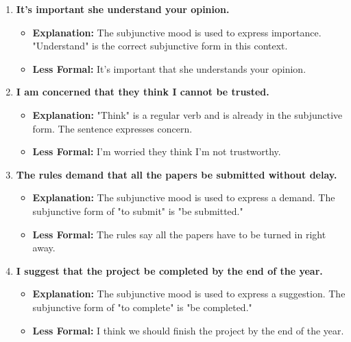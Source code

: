 \begin{enumerate}
\begin{itemize}
            \end{itemize}
      \item \textbf{It's important she understand your opinion.}
            \begin{itemize}
                  \item \textbf{Explanation:} The subjunctive mood is used to express importance. "Understand" is the correct subjunctive form in this context.
                  \item \textbf{Less Formal:} It's important that she understands your opinion.
            \end{itemize}
      \item \textbf{I am concerned that they think I cannot be trusted.}
            \begin{itemize}
                  \item \textbf{Explanation:} "Think" is a regular verb and is already in the subjunctive form. The sentence expresses concern.
                  \item \textbf{Less Formal:} I'm worried they think I'm not trustworthy.
            \end{itemize}
      \item \textbf{The rules demand that all the papers be submitted without delay.}
            \begin{itemize}
                  \item \textbf{Explanation:} The subjunctive mood is used to express a demand. The subjunctive form of "to submit" is "be submitted."
                  \item \textbf{Less Formal:} The rules say all the papers have to be turned in right away.
            \end{itemize}
      \item \textbf{I suggest that the project be completed by the end of the year.}
            \begin{itemize}
                  \item \textbf{Explanation:} The subjunctive mood is used to express a suggestion. The subjunctive form of "to complete" is "be completed."
                  \item \textbf{Less Formal:} I think we should finish the project by the end of the year.
            \end{itemize}
\end{enumerate}


